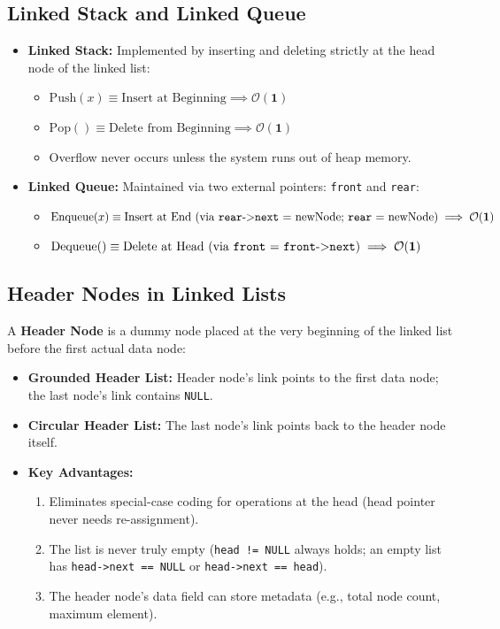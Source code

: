 \documentclass[12pt,a4paper]{article}
\begin{document}
\subsection{Linked Stack and Linked Queue}
\begin{itemize}[leftmargin=*, itemsep=3pt]
  \item \textbf{Linked Stack:} Implemented by inserting and deleting strictly at the head node of the linked list:
  \begin{itemize}[leftmargin=*, nosep]
    \item $\text{Push}(x) \equiv \text{Insert at Beginning} \implies \mathbf{\mathcal{O}(1)}$
    \item $\text{Pop}() \equiv \text{Delete from Beginning} \implies \mathbf{\mathcal{O}(1)}$
    \item Overflow never occurs unless the system runs out of heap memory.
  \end{itemize}
  \item \textbf{Linked Queue:} Maintained via two external pointers: \texttt{front} and \texttt{rear}:
  \begin{itemize}[leftmargin=*, nosep]
    \item $\text{Enqueue}(x) \equiv \text{Insert at End (via \texttt{rear}->\texttt{next} = newNode; \texttt{rear} = newNode)} \implies \mathbf{\mathcal{O}(1)}$
    \item $\text{Dequeue}() \equiv \text{Delete at Head (via \texttt{front} = \texttt{front}->\texttt{next})} \implies \mathbf{\mathcal{O}(1)}$
  \end{itemize}
\end{itemize}

\subsection{Header Nodes in Linked Lists}
A \textbf{Header Node} is a dummy node placed at the very beginning of the linked list before the first actual data node:
\begin{itemize}[leftmargin=*, itemsep=2pt]
  \item \textbf{Grounded Header List:} Header node's link points to the first data node; the last node's link contains \texttt{NULL}.
  \item \textbf{Circular Header List:} The last node's link points back to the header node itself.
  \item \textbf{Key Advantages:}
  \begin{enumerate}[leftmargin=*, nosep]
    \item Eliminates special-case coding for operations at the head (head pointer never needs re-assignment).
    \item The list is never truly empty (\texttt{head != NULL} always holds; an empty list has \texttt{head->next == NULL} or \texttt{head->next == head}).
    \item The header node's data field can store metadata (e.g., total node count, maximum element).
  \end{enumerate}
\end{itemize}
\end{document}
